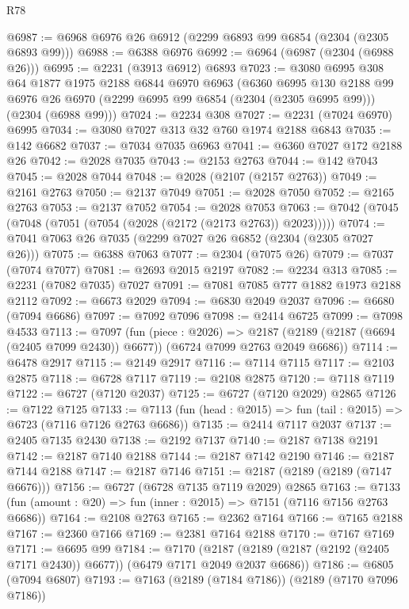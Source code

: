 \begin{lexlean}{R78}
\begin{coremodule}
@6987 := @6968 @6976 @26 @6912 (@2299 @6893 @99 @6854 (@2304 (@2305 @6893 @99)))
@6988 := @6388 @6976
@6992 := @6964 (@6987 (@2304 (@6988 @26)))
@6995 := @2231 (@3913 @6912) @6893
@7023 := @3080
    @6995
    @308
    @64
    @1877
    @1975
    @2188
    @6844
    @6970
    @6963
    (@6360
      @6995
      @130
      @2188
      @99
      @6976
      @26
      @6970
      (@2299 @6995 @99 @6854 (@2304 (@2305 @6995 @99)))
      (@2304 (@6988 @99)))
@7024 := @2234 @308
@7027 := @2231 (@7024 @6970) @6995
@7034 := @3080 @7027 @313 @32 @760 @1974 @2188 @6843
@7035 := @142 @6682
@7037 := @7034 @7035 @6963
@7041 := @6360 @7027 @172 @2188 @26
@7042 := @2028 @7035
@7043 := @2153 @2763
@7044 := @142 @7043
@7045 := @2028 @7044
@7048 := @2028 (@2107 (@2157 @2763))
@7049 := @2161 @2763
@7050 := @2137 @7049
@7051 := @2028 @7050
@7052 := @2165 @2763
@7053 := @2137 @7052
@7054 := @2028 @7053
@7063 := @7042 (@7045 (@7048 (@7051 (@7054 (@2028 (@2172 (@2173 @2763)) @2023)))))
@7074 := @7041 @7063 @26 @7035 (@2299 @7027 @26 @6852 (@2304 (@2305 @7027 @26)))
@7075 := @6388 @7063
@7077 := @2304 (@7075 @26)
@7079 := @7037 (@7074 @7077)
@7081 := @2693 @2015 @2197
@7082 := @2234 @313
@7085 := @2231 (@7082 @7035) @7027
@7091 := @7081 @7085 @777 @1882 @1973 @2188 @2112
@7092 := @6673 @2029
@7094 := @6830 @2049 @2037
@7096 := @6680 (@7094 @6686)
@7097 := @7092 @7096
@7098 := @2414 @6725
@7099 := @7098 @4533
@7113 := @7097
    (fun (piece : @2026) =>
    @2187 (@2189 (@2187 (@6694 (@2405 @7099 @2430)) @6677)) (@6724 @7099 @2763 @2049 @6686))
@7114 := @6478 @2917
@7115 := @2149 @2917
@7116 := @7114 @7115
@7117 := @2103 @2875
@7118 := @6728 @7117
@7119 := @2108 @2875
@7120 := @7118 @7119
@7122 := @6727 (@7120 @2037)
@7125 := @6727 (@7120 @2029) @2865
@7126 := @7122 @7125
@7133 := @7113 (fun (head : @2015) => fun (tail : @2015) => @6723 (@7116 @7126 @2763 @6686))
@7135 := @2414 @7117 @2037
@7137 := @2405 @7135 @2430
@7138 := @2192 @7137
@7140 := @2187 @7138 @2191
@7142 := @2187 @7140 @2188
@7144 := @2187 @7142 @2190
@7146 := @2187 @7144 @2188
@7147 := @2187 @7146
@7151 := @2187 (@2189 (@2189 (@7147 @6676)))
@7156 := @6727 (@6728 @7135 @7119 @2029) @2865
@7163 := @7133 (fun (amount : @20) => fun (inner : @2015) => @7151 (@7116 @7156 @2763 @6686))
@7164 := @2108 @2763
@7165 := @2362 @7164
@7166 := @7165 @2188
@7167 := @2360 @7166
@7169 := @2381 @7164 @2188
@7170 := @7167 @7169
@7171 := @6695 @99
@7184 := @7170
    (@2187 (@2189 (@2187 (@2192 (@2405 @7171 @2430)) @6677)) (@6479 @7171 @2049 @2037 @6686))
@7186 := @6805 (@7094 @6807)
@7193 := @7163 (@2189 (@7184 @7186)) (@2189 (@7170 @7096 @7186))

\end{coremodule}
\end{lexlean}
